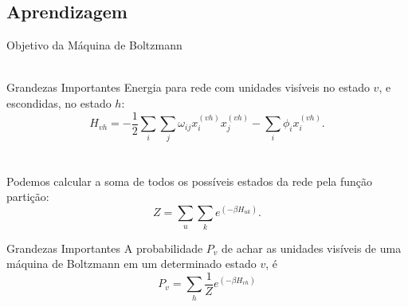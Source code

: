 \subsection{Aprendizagem}%
\begin{frame}{Objetivo da Máquina de Boltzmann}%
  \justiying%
  \\~\\

\end{frame}

\begin{frame}{Grandezas Importantes}%
  \justifying%
  Energia para rede com unidades visíveis no estado $v$, e escondidas, no estado $h$:
  \begin{equation}%
    \label{eq:bm-energy}
    H_{vh} = -\frac{1}{2} \sum_{i} \sum_{j} \omega_{ij} x^{(vh)}_{i} x^{(vh)}_{j} - \sum_{i} \phi_{i} x^{(vh)}_{i}.
  \end{equation}
  \\~\\
  Podemos calcular a soma de todos os possíveis estados da rede pela função partição:
  \begin{equation}%
    \label{eq:bm-partition}
    Z = \sum_{u} \sum_{k} e^{(-\beta H_{uk})}.
  \end{equation}
\end{frame}

\begin{frame}{Grandezas Importantes}%
  A probabilidade $P_{v}$ de achar as unidades visíveis de uma máquina de Boltzmann em um determinado estado $v$, é
  \begin{equation}%
    \label{eq:bm-prob-marg}%
    P_{v} = \sum_{h} \frac{1}{Z} e^{(-\beta H_{vh})}
  \end{equation}
\end{frame}

